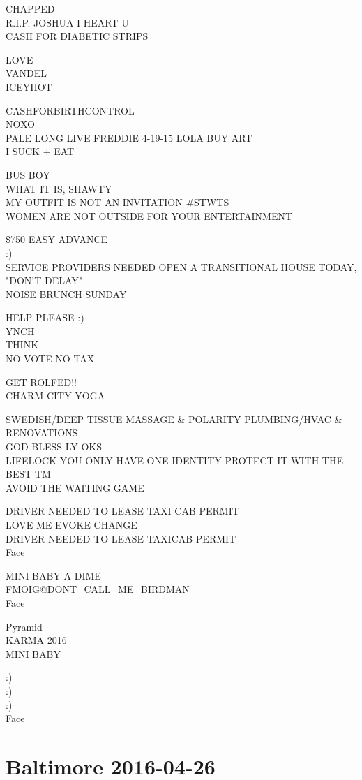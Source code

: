 \documentclass[10pt,letterpaper]{article}
\begin{document}
CHAPPED\\
R.I.P. JOSHUA I HEART U\\
CASH FOR DIABETIC STRIPS

LOVE\\
VANDEL\\
ICEYHOT

CASHFORBIRTHCONTROL\\
NOXO\\
PALE LONG LIVE FREDDIE 4{-}19{-}15 LOLA BUY ART\\
I SUCK + EAT

BUS BOY\\
WHAT IT IS, SHAWTY\\
MY OUTFIT IS NOT AN INVITATION \#STWTS\\
WOMEN ARE NOT OUTSIDE FOR YOUR ENTERTAINMENT

\$750 EASY ADVANCE\\
:)\\
SERVICE PROVIDERS NEEDED OPEN A TRANSITIONAL HOUSE TODAY, "DON'T DELAY"\\
NOISE BRUNCH SUNDAY

HELP PLEASE :)\\
YNCH\\
THINK\\
NO VOTE NO TAX

GET ROLFED!!\\
CHARM CITY YOGA

SWEDISH/DEEP TISSUE MASSAGE \& POLARITY PLUMBING/HVAC \& RENOVATIONS\\
GOD BLESS LY OKS\\
LIFELOCK YOU ONLY HAVE ONE IDENTITY PROTECT IT WITH THE BEST TM\\
AVOID THE WAITING GAME

DRIVER NEEDED TO LEASE TAXI CAB PERMIT\\
LOVE ME EVOKE CHANGE\\
DRIVER NEEDED TO LEASE TAXICAB PERMIT\\
Face

MINI BABY A DIME\\
FMOIG@DONT\_CALL\_ME\_BIRDMAN\\
Face

Pyramid\\
KARMA 2016\\
MINI BABY

:)\\
:)\\
:)\\
Face


\section*{Baltimore 2016-04-26}
\end{document}
